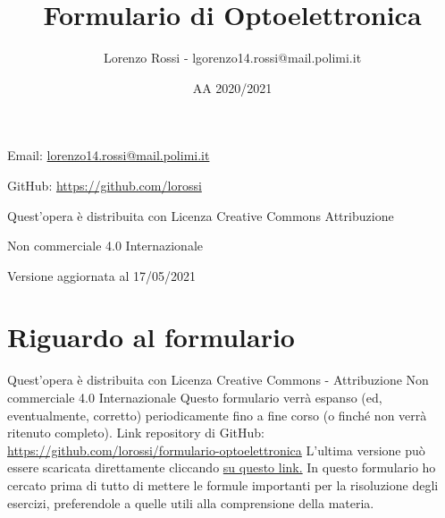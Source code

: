 \documentclass{article}
\title{Formulario di Optoelettronica}
\author{Lorenzo Rossi - lgorenzo14.rossi@mail.polimi.it}
\date{AA 2020/2021}
\begin{document}
\maketitle

\vspace{18em}

\large
\begin{doublespacing}\hypersetup{
    urlcolor=black,
  }
  \centerline{Email: \href{mailto://lorenzo14.rossi@mail.polimi.it}{lorenzo14.rossi@mail.polimi.it}}
  \centerline{GitHub: \url{https://github.com/lorossi}}

  \vspace{18em}
  \centerline{Quest'opera è distribuita con Licenza Creative Commons Attribuzione}
  \centerline{Non commerciale 4.0 Internazionale \ccbynceu}
  \centerline{Versione aggiornata al 17/05/2021}
\end{doublespacing}
\newpage


\tableofcontents
\clearpage
{}
\newpage

\section{Riguardo al formulario}
Quest'opera è distribuita con Licenza Creative Commons - Attribuzione Non commerciale 4.0 Internazionale \ccbynceu \newline
Questo formulario verrà espanso (ed, eventualmente, corretto) periodicamente fino a fine corso (o finché non verrà ritenuto completo). \newline
Link repository di GitHub: \url{https://github.com/lorossi/formulario-optoelettronica} \newline
L'ultima versione può essere scaricata direttamente cliccando \href{https://github.com/lorossi/formulario-optoelettronica/raw/master/formulario-optoelettronica.pdf}{su questo link.} \newline
In questo formulario ho cercato prima di tutto di mettere le formule importanti per la risoluzione degli esercizi, preferendole a quelle utili alla comprensione della materia.
\newpage
\end{document}
